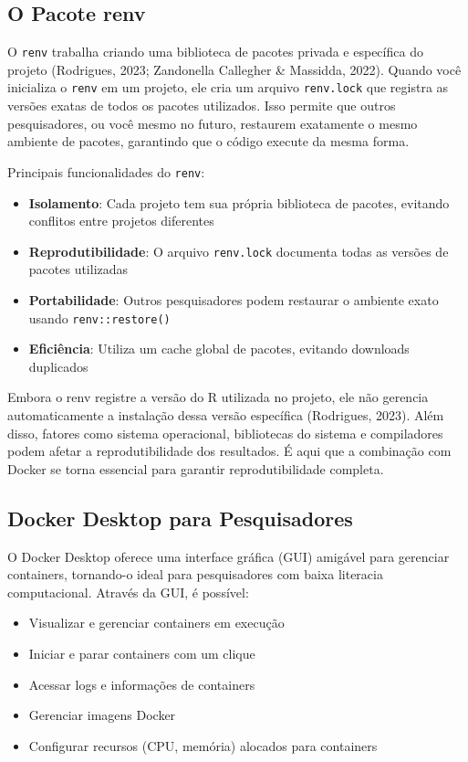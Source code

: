 \documentclass[
  a4paper,
]{book}
\providecommand{\tightlist}{%
  \setlength{\itemsep}{0pt}\setlength{\parskip}{0pt}}\usepackage{longtable,booktabs,array}
\begin{document}
\subsection{O Pacote renv}\label{o-pacote-renv}

O \texttt{renv} trabalha criando uma biblioteca de pacotes privada e
específica do projeto (Rodrigues, 2023; Zandonella Callegher \&
Massidda, 2022). Quando você inicializa o \texttt{renv} em um projeto,
ele cria um arquivo \texttt{renv.lock} que registra as versões exatas de
todos os pacotes utilizados. Isso permite que outros pesquisadores, ou
você mesmo no futuro, restaurem exatamente o mesmo ambiente de pacotes,
garantindo que o código execute da mesma forma.

Principais funcionalidades do \texttt{renv}:

\begin{itemize}
\tightlist
\item
  \textbf{Isolamento}: Cada projeto tem sua própria biblioteca de
  pacotes, evitando conflitos entre projetos diferentes
\item
  \textbf{Reprodutibilidade}: O arquivo \texttt{renv.lock} documenta
  todas as versões de pacotes utilizadas
\item
  \textbf{Portabilidade}: Outros pesquisadores podem restaurar o
  ambiente exato usando \texttt{renv::restore()}
\item
  \textbf{Eficiência}: Utiliza um cache global de pacotes, evitando
  downloads duplicados
\end{itemize}

Embora o renv registre a versão do R utilizada no projeto, ele não
gerencia automaticamente a instalação dessa versão específica
(Rodrigues, 2023). Além disso, fatores como sistema operacional,
bibliotecas do sistema e compiladores podem afetar a reprodutibilidade
dos resultados. É aqui que a combinação com Docker se torna essencial
para garantir reprodutibilidade completa.

\subsection{Docker Desktop para
Pesquisadores}\label{docker-desktop-para-pesquisadores}

O Docker Desktop oferece uma interface gráfica (GUI) amigável para
gerenciar containers, tornando-o ideal para pesquisadores com baixa
literacia computacional. Através da GUI, é possível:

\begin{itemize}
\tightlist
\item
  Visualizar e gerenciar containers em execução
\item
  Iniciar e parar containers com um clique
\item
  Acessar logs e informações de containers
\item
  Gerenciar imagens Docker
\item
  Configurar recursos (CPU, memória) alocados para containers
\end{itemize}
\end{document}
